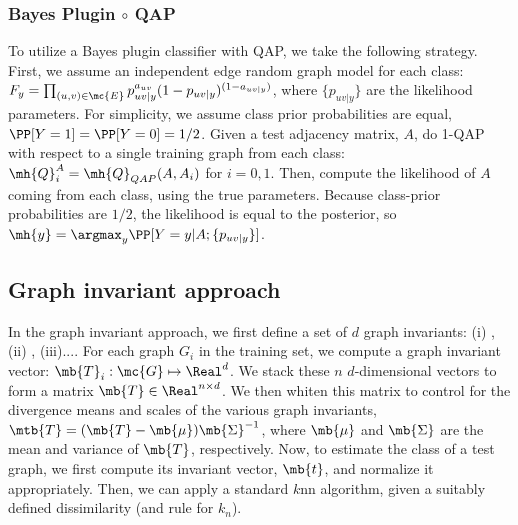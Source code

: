 

\subsubsection{Bayes Plugin $\circ$ QAP} %
\label{ssub:bayes_plugin_circ_qap}


To utilize a Bayes plugin classifier with QAP, we take the following strategy.  First, we assume an independent edge random graph model for each class: $F_y=\prod_{(u,v) \in \mc{E}}p_{uv|y}^{a_{uv}} (1-p_{uv|y})^{(1-a_{uv|y})}$, where $\{p_{uv|y}\}$ are the likelihood parameters.  For simplicity, we assume class prior probabilities are equal, $\PP[Y=1]=\PP[Y=0]=1/2$.  Given a test adjacency matrix, $A$,  do 1-QAP with respect to a single training graph from each class: $\mh{Q}_i^A=\mh{Q}_{QAP}(A,A_i)$ for $i=0,1$.  Then, compute the likelihood of $A$ coming from each class, using the true parameters.  Because class-prior probabilities are $1/2$, the likelihood is equal to the posterior, so $\mh{y}=\argmax_y \PP[Y=y | A; \{p_{uv|y}\}]$.



\subsection{Graph invariant approach} %
\label{sub:graph_invariant_approach}

In the graph invariant approach, we first define a set of $d$ graph invariants: (i) , (ii) , (iii)....  For each graph $G_i$ in the training set, we compute a graph invariant vector: $\mb{T}_i: \mc{G} \mapsto \Real^d$.  We stack these $n$ $d$-dimensional vectors to form a matrix $\mb{T} \in \Real^{n \times d}$. We then whiten this matrix to control for the divergence means and scales of the various graph invariants, $\mtb{T}=(\mb{T}-\mb{\mu}) \mb{\Sigma}^{-1}$, where $\mb{\mu}$ and $\mb{\Sigma}$ are the mean and variance of $\mb{T}$, respectively.  Now, to estimate the class of a test graph, we first compute its invariant vector, $\mb{t}$, and normalize it appropriately.  Then, we can apply a standard $k$nn algorithm, given a suitably defined dissimilarity (and rule for $k_n$).





